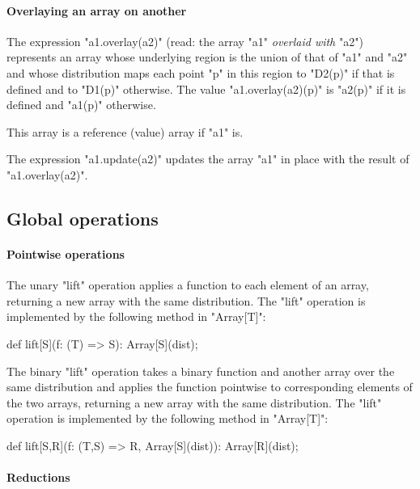 \paragraph{Overlaying an array on another}
The expression
\xcd"a1.overlay(a2)" (read: the array \xcd"a1" {\em overlaid with} \xcd"a2")
represents an array whose underlying region is the union of that of
\xcd"a1" and \xcd"a2" and whose distribution maps each point \xcd"p"
in this region to \xcd"D2(p)" if that is defined and to \xcd"D1(p)"
otherwise. The value \xcd"a1.overlay(a2)(p)" is \xcd"a2(p)" if it is defined and \xcd"a1(p)" otherwise.

This array is a reference (value) array if \xcd"a1" is.

The expression \xcd"a1.update(a2)" updates the array \xcd"a1" in place
with the result of \xcd"a1.overlay(a2)".




\subsection{Global operations }

\paragraph{Pointwise operations}\label{ArrayPointwise}
The unary \xcd"lift" operation applies a function to each element of
an array, returning a new array with the same distribution.
The \xcd"lift" operation is implemented by the following method
in \xcd"Array[T]":
\begin{xten}
def lift[S](f: (T) => S): Array[S](dist);
\end{xten}

The binary \xcd"lift" operation takes a binary function and
another
array over the same distribution and applies the function
pointwise to corresponding elements of the two arrays, returning
a new array with the same distribution.
The \xcd"lift" operation is implemented by the following method
in \xcd"Array[T]":
\begin{xten}
def lift[S,R](f: (T,S) => R, Array[S](dist)): Array[R](dist);
\end{xten}

\paragraph{Reductions}\label{ArrayReductions}

